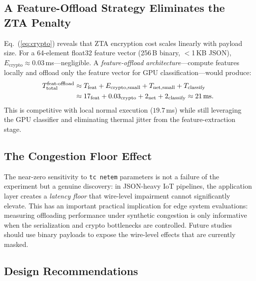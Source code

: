 \documentclass[10pt,twocolumn]{article}
\begin{document}
\subsection{A Feature-Offload Strategy Eliminates the ZTA Penalty}

Eq.~(\ref{eq:crypto}) reveals that ZTA encryption cost scales linearly
with payload size.  For a 64-element float32 feature vector (256\,B binary,
$<$1\,KB JSON), $E_{\text{crypto}} \approx 0.03$\,ms—negligible.  A
\emph{feature-offload architecture}—compute features locally and offload
only the feature vector for GPU classification—would produce:
\begin{align}
T_{\text{total}}^{\text{feat-offload}}
    &\approx T_{\text{feat}} + E_{\text{crypto,small}}
       + T_{\text{net,small}} + T_{\text{classify}} \notag \\
    &\approx 17_{\text{feat}} + 0.03_{\text{crypto}}
       + 2_{\text{net}} + 2_{\text{classify}} \approx 21\,\text{ms}.
\end{align}
This is competitive with local normal execution ($19.7$\,ms) while still
leveraging the GPU classifier and eliminating thermal jitter from the
feature-extraction stage.

\subsection{The Congestion Floor Effect}

The near-zero sensitivity to \texttt{tc netem} parameters is not a failure
of the experiment but a genuine discovery: in JSON-heavy IoT pipelines,
the application layer creates a \emph{latency floor} that wire-level
impairment cannot significantly elevate.  This has an important practical
implication for edge system evaluations: measuring offloading performance
under synthetic congestion is only informative when the serialization
and crypto bottlenecks are controlled.  Future studies should use binary
payloads to expose the wire-level effects that are currently masked.

\subsection{Design Recommendations}
\end{document}
